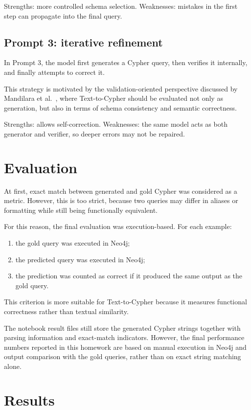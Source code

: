 \documentclass{article}
\begin{document}
Strengths: more controlled schema selection. Weaknesses: mistakes in the first step can propagate into the final query.

\subsection{Prompt 3: iterative refinement}

In Prompt 3, the model first generates a Cypher query, then verifies it internally, and finally attempts to correct it.

This strategy is motivated by the validation-oriented perspective discussed by Mandilara et al.~\cite{mandilara2025decoding}, where Text-to-Cypher should be evaluated not only as generation, but also in terms of schema consistency and semantic correctness.

Strengths: allows self-correction. Weaknesses: the same model acts as both generator and verifier, so deeper errors may not be repaired.

\section{Evaluation}

At first, exact match between generated and gold Cypher was considered as a metric. However, this is too strict, because two queries may differ in aliases or formatting while still being functionally equivalent.

For this reason, the final evaluation was execution-based. For each example:
\begin{enumerate}
    \item the gold query was executed in Neo4j;
    \item the predicted query was executed in Neo4j;
    \item the prediction was counted as correct if it produced the same output as the gold query.
\end{enumerate}

This criterion is more suitable for Text-to-Cypher because it measures functional correctness rather than textual similarity.

The notebook result files still store the generated Cypher strings together with parsing information and exact-match indicators. However, the final performance numbers reported in this homework are based on manual execution in Neo4j and output comparison with the gold queries, rather than on exact string matching alone.

\section{Results}
\end{document}
